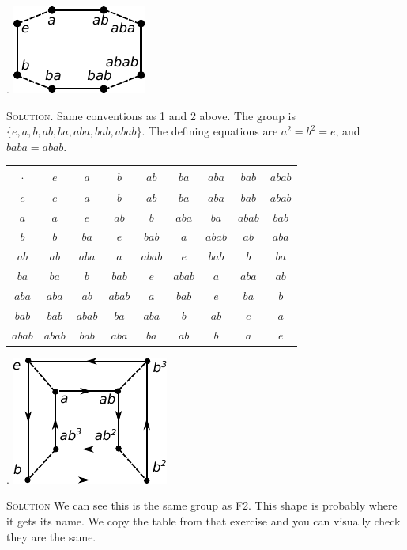 \documentclass[twoside]{amsart}
\newcommand{\solution}{\textsc{Solution}\xspace}
\begin{document}
\begin{enumerate}[A.]
    . \includegraphics{img/chap5g3.pdf}

    \noindent \solution. Same conventions as 1 and 2 above. The group
    is $\{e,a,b,ab,ba,aba,bab,abab\}$. The defining equations are
    $a^2=b^2=e$, and $baba=abab$.
    \begin{center}
    \begin{tabular}{c|cccccccc}
    $\cdot$  & $e$ & $a$ & $b$ & $ab$ & $ba$ & $aba$ & $bab$ & $abab$\\\hline
    $e$      & $e$ & $a$ & $b$ & $ab$ & $ba$ & $aba$ & $bab$ & $abab$\\
    $a$      & $a$ & $e$ & $ab$ & $b$ & $aba$ & $ba$ & $abab$ & $bab$\\
    $b$      & $b$ & $ba$ & $e$ & $bab$ & $a$ & $abab$ & $ab$ & $aba$\\
    $ab$     & $ab$ & $aba$ & $a$ & $abab$ & $e$ & $bab$ & $b$ & $ba$\\
    $ba$     & $ba$ & $b$ & $bab$ & $e$ & $abab$ & $a$ & $aba$ & $ab$\\
    $aba$    & $aba$ & $ab$ & $abab$ & $a$ & $bab$ & $e$ & $ba$ & $b$\\
    $bab$    & $bab$ & $abab$ & $ba$ & $aba$ & $b$ & $ab$ & $e$ & $a$\\
    $abab$   & $abab$ & $bab$ & $aba$ & $ba$ & $ab$ & $b$ & $a$ & $e$
    \end{tabular}
    \end{center}

    . \includegraphics{img/chap5g4.pdf}

    \noindent \solution We can see this is the same group as 
    F2. This shape is probably where it gets its name. We copy the table
    from that exercise and you can visually check they are the same.


\end{enumerate}
\end{document}
